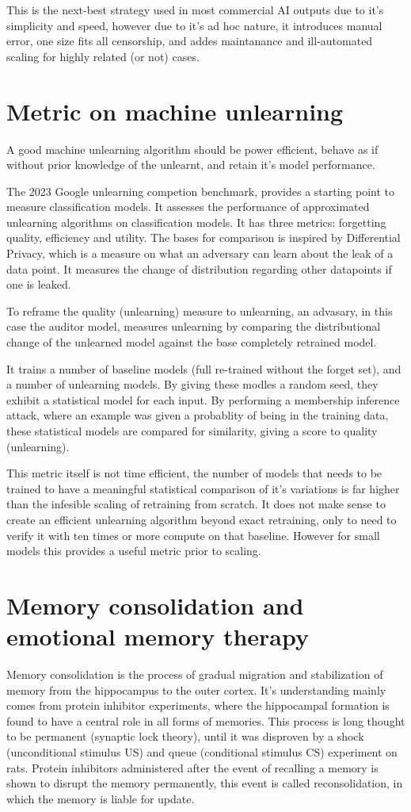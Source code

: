 \documentclass{surreydissertation}
\begin{document}
This is the next-best strategy used in most commercial AI outputs due to it's simplicity and speed, however due to it's ad hoc nature, it introduces manual error, one size fits all censorship, and addes maintanance and ill-automated scaling for highly related (or not) cases.

\section{Metric on machine unlearning}
A good machine unlearning algorithm should be power efficient, behave as if without prior knowledge of the unlearnt, and retain it's model performance.

The 2023 Google unlearning competion benchmark, provides a starting point to measure classification models. It assesses the performance of approximated unlearning algorithms on classification models. It has three metrics: forgetting quality, efficiency and utility. The bases for comparison is inspired by Differential Privacy, which is a measure on what an adversary can learn about the leak of a data point. It measures the change of distribution regarding other datapoints if one is leaked.

To reframe the quality (unlearning) measure to unlearning, an advasary, in this case the auditor model, measures unlearning by comparing the distributional change of the unlearned model against the base completely retrained model.

It trains a number of baseline models (full re-trained without the forget set), and a number of unlearning models. By giving these modles a random seed, they exhibit a statistical model for each input. By performing a membership inference attack, where an example was given a probablity of being in the training data, these statistical models are compared for similarity, giving a score to quality (unlearning).

This metric itself is not time efficient, the number of models that needs to be trained to have a meaningful statistical comparison of it's variations is far higher than the infesible scaling of retraining from scratch. It does not make sense to create an efficient unlearning algorithm beyond exact retraining, only to need to verify it with ten times or more compute on that baseline. However for small models this provides a useful metric prior to scaling.


\section{Memory consolidation and emotional memory therapy}
Memory consolidation is the process of gradual migration and stabilization of memory from the hippocampus to the outer cortex. It's understanding mainly comes from protein inhibitor experiments, where the hippocampal formation is found to have a central role in all forms of memories. This process is long thought to be permanent (synaptic lock theory), until it was disproven by a shock (unconditional stimulus US) and queue (conditional stimulus CS) experiment on rats. Protein inhibitors administered after the event of recalling a memory is shown to disrupt the memory permanently, this event is called reconsolidation, in which the memory is liable for update.
\end{document}
